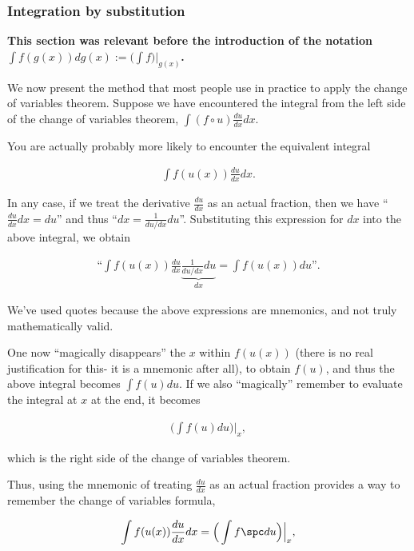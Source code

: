 \subsubsection*{Integration by substitution}

\textbf{This section was relevant before the introduction of the notation $\int f(g(x)) dg(x) := \Big(\int f\Big)\Big|_{g(x)}$.}

We now present the method that most people use in practice to apply the change of variables theorem. Suppose we have encountered the integral from the left side of the change of variables theorem, $\int (f \circ u) \frac{du}{dx} dx$.

You are actually probably more likely to encounter the equivalent integral

\begin{align*}
    \int f(u(x)) \frac{du}{dx} dx.
\end{align*}

In any case, if we treat the derivative $\frac{du}{dx}$ as an actual fraction, then we have ``$\frac{du}{dx} dx = du$'' and thus ``$dx = \frac{1}{du/dx} du$''. Substituting this expression for $dx$ into the above integral, we obtain

\begin{align*}
    \text{``}\int f(u(x)) \frac{du}{dx} \underbrace{\frac{1}{du/dx} du}_{dx} = \int f(u(x)) du \text{''}.
\end{align*}

We've used quotes because the above expressions are mnemonics, and not truly mathematically valid. 

One now ``magically disappears'' the $x$ within $f(u(x))$ (there is no real justification for this- it is a mnemonic after all), to obtain $f(u)$, and thus the above integral becomes $\int f(u) du$. If we also ``magically'' remember to evaluate the integral at $x$ at the end, it becomes

\begin{align*}
    \Big(\int f(u) du\Big)\Big|_x,
\end{align*}

which is the right side of the change of variables theorem.

Thus, using the mnemonic of treating $\frac{du}{dx}$ as an actual fraction provides a way to remember the change of variables formula, 

\begin{align*}
    \int f(u(x)) \frac{du}{dx} dx = \Big( \int f \spc du \Big)\Big|_x,
\end{align*}

